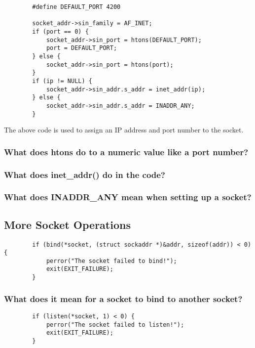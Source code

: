 \documentclass{article}
\begin{document}
	\begin{lstlisting}
		#define DEFAULT_PORT 4200
		
		socket_addr->sin_family = AF_INET;
		if (port == 0) {
			socket_addr->sin_port = htons(DEFAULT_PORT);
			port = DEFAULT_PORT;
		} else {
			socket_addr->sin_port = htons(port);
		}
		if (ip != NULL) {
			socket_addr->sin_addr.s_addr = inet_addr(ip);
		} else {
			socket_addr->sin_addr.s_addr = INADDR_ANY;
		}
	\end{lstlisting}
	
	The above code is used to assign an IP address and port number to the socket. 
	
	\subsubsection{What does htons do to a numeric value like a port number?}
	\vspace{72pt}
	\subsubsection{What does inet\_addr() do in the code?}
	\vspace{72pt}
	\subsubsection{What does INADDR\_ANY mean when setting up a socket?}
	
	\pagebreak{}
	
	
	\begin{Large}
		\subsection{\textbf{More Socket Operations}}
	\end{Large}
	
	\begin{lstlisting}
		if (bind(*socket, (struct sockaddr *)&addr, sizeof(addr)) < 0) {
			perror("The socket failed to bind!");
			exit(EXIT_FAILURE);
		}
	\end{lstlisting}
	
	\subsubsection{What does it mean for a socket to bind to another socket?}
	\vspace{72pt}
	
	\begin{lstlisting}
		if (listen(*socket, 1) < 0) {
			perror("The socket failed to listen!");
			exit(EXIT_FAILURE);
		}
	\end{lstlisting}
	
\end{document}
